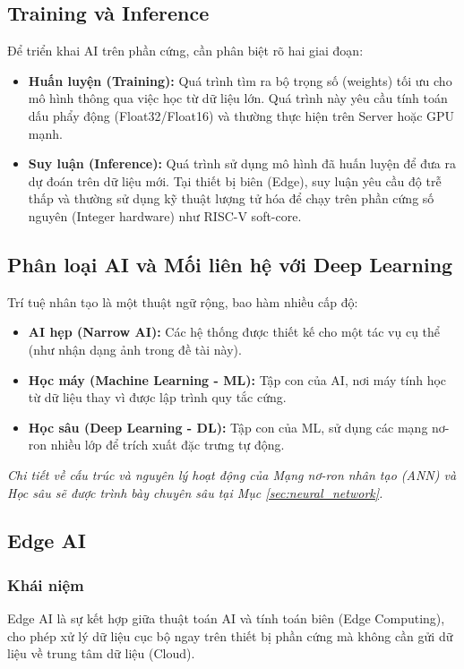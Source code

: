 \subsection{Training và Inference}
Để triển khai AI trên phần cứng, cần phân biệt rõ hai giai đoạn:
\begin{itemize}
    \item \textbf{Huấn luyện (Training):} Quá trình tìm ra bộ trọng số (weights) tối ưu cho mô hình thông qua việc học từ dữ liệu lớn. Quá trình này yêu cầu tính toán dấu phẩy động (Float32/Float16) và thường thực hiện trên Server hoặc GPU mạnh.
    \item \textbf{Suy luận (Inference):} Quá trình sử dụng mô hình đã huấn luyện để đưa ra dự đoán trên dữ liệu mới. Tại thiết bị biên (Edge), suy luận yêu cầu độ trễ thấp và thường sử dụng kỹ thuật lượng tử hóa để chạy trên phần cứng số nguyên (Integer hardware) như RISC-V soft-core.
\end{itemize}

\subsection{Phân loại AI và Mối liên hệ với Deep Learning}
Trí tuệ nhân tạo là một thuật ngữ rộng, bao hàm nhiều cấp độ:
\begin{itemize}
    \item \textbf{AI hẹp (Narrow AI):} Các hệ thống được thiết kế cho một tác vụ cụ thể (như nhận dạng ảnh trong đề tài này).
    \item \textbf{Học máy (Machine Learning - ML):} Tập con của AI, nơi máy tính học từ dữ liệu thay vì được lập trình quy tắc cứng.
    \item \textbf{Học sâu (Deep Learning - DL):} Tập con của ML, sử dụng các mạng nơ-ron nhiều lớp để trích xuất đặc trưng tự động.
\end{itemize}
\textit{Chi tiết về cấu trúc và nguyên lý hoạt động của Mạng nơ-ron nhân tạo (ANN) và Học sâu sẽ được trình bày chuyên sâu tại Mục \ref{sec:neural_network}.}

\subsection{Edge AI}

\subsubsection{Khái niệm}
Edge AI là sự kết hợp giữa thuật toán AI và tính toán biên (Edge Computing), cho phép xử lý dữ liệu cục bộ ngay trên thiết bị phần cứng mà không cần gửi dữ liệu về trung tâm dữ liệu (Cloud).

